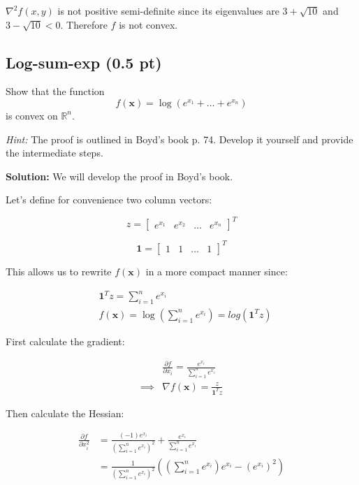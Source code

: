 \documentclass{article}
\begin{document}
$\nabla^2 f(x, y)$ is not positive semi-definite since its eigenvalues are $3 + \sqrt{10}$ and $3 - \sqrt{10} < 0 $.
Therefore $f$ is not convex.

\subsection*{Log-sum-exp (0.5 pt)}

Show that the function
\[
    f(\bm{x}) = \log(e^{x_1} + \ldots + e^{x_n})
\]
is convex on $\mathbb{R}^n$.

\textit{Hint:} The proof is outlined in Boyd's book p. 74. Develop it yourself and provide the intermediate steps.

\textbf{Solution:} We will develop the proof in Boyd's book.

Let's define for convenience two column vectors:

\[
    z =
    \begin{bmatrix}
        e^{x_1} &
        e^{x_2} &
        \dots   &
        e^{x_n}
    \end{bmatrix}^{T}
\]

\[
    \bm{1} = \begin{bmatrix}
        1     &
        1     &
        \dots &
        1
    \end{bmatrix}^{T}
\]

This allows us to rewrite $f(\bm{x})$ in a more compact manner since:

\begin{align}
     & \bm{1}^{T} z = \sum_{i=1}^{n} e^{x_i}                        \\
     & f(\bm{x}) = \log(\sum_{i=1}^{n} e^{x_i}) = log(\bm{1}^{T} z)
\end{align}

First calculate the gradient:

\begin{align}
             & \frac{\partial f}{\partial x_i} =  \frac{e^{x_i}}{\sum_{i=1}^{n} e^{x_i}} \\
    \implies & \nabla f(\bm{x}) = \frac{z}{\bm{1}^{T} z}
\end{align}

Then calculate the Hessian:

%  
% 

\begin{align}
    \frac{\partial f}{\partial x_i^2} & = \frac{(-1) e^{x_i}}{\left( \sum_{i=1}^{n} e^{x_i} \right)^2} + \frac{e^{x_i}}{\sum_{i=1}^{n} e^{x_i}}                      \\
                                      & = \frac{1}{\left( \sum_{i=1}^{n} e^{x_i} \right)^2} \left( \left(\sum_{i=1}^{n} e^{x_i}\right) e^{x_i} - (e^{x_i})^2 \right)
\end{align}
\end{document}
